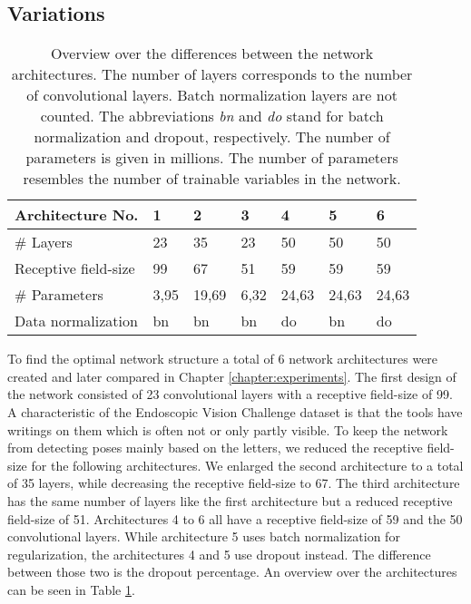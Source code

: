 \subsection{Variations} \label{section:network_variations}




\begin{table}[]
\centering
\begin{tabular}{|l||llllll|}
\hline Architecture No.        & 1          & 2          & 3          & 4          & 5          & 6        \\ \hline\hline
\rowcolor{Gray}
\# Layers               & 23         & 35         & 23         & 50         & 50         & 50       \\
Receptive field-size    & 99         & 67         & 51         & 59         & 59         & 59       \\
\rowcolor{Gray}
\# Parameters & 3,95  & 19,69 & 6,32  & 24,63 & 24,63   & 24,63 \\
Data normalization      & bn & bn & bn & do    & bn & do \\ \hline
\end{tabular}
\caption{Overview over the differences between the network architectures. The number of layers corresponds to the number of convolutional layers. Batch normalization layers are not counted. The abbreviations \textit{bn} and \textit{do} stand for batch normalization and dropout, respectively. The number of parameters is given in millions. The number of parameters resembles the number of trainable variables in the network.}
\label{table:network_architectures}
\end{table}

To find the optimal network structure a total of 6 network architectures were created and later compared in Chapter \ref{chapter:experiments}. The first design of the network consisted of 23 convolutional layers with a receptive field-size of 99. A characteristic of the Endoscopic Vision Challenge dataset is that the tools have writings on them which is often not or only partly visible. To keep the network from detecting poses mainly based on the letters, we reduced the receptive field-size for the following architectures. We enlarged the second architecture to a total of 35 layers, while decreasing the receptive field-size to 67. The third architecture has the same number of layers like the first architecture but a reduced receptive field-size of 51. Architectures 4 to 6 all have a receptive field-size of 59 and the 50 convolutional layers. While architecture 5 uses batch normalization for regularization, the architectures 4 and 5 use dropout instead. The difference between those two is the dropout percentage. An overview over the architectures can be seen in Table \ref{table:network_architectures}. 

